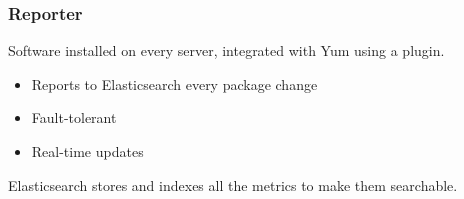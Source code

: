 \documentclass[aspectratio=169]{beamer}
\begin{document}

\begin{frame}
    \frametitle{Reporter}

    Software installed on every server, integrated with Yum using a plugin.

    \begin{itemize}
        \item Reports to Elasticsearch every package change
        \item Fault-tolerant
        \item Real-time updates
    \end{itemize}

    Elasticsearch stores and indexes all the metrics to make them searchable.

    \begin{center}
        \vspace{10px}
    \end{center}
\end{frame}

\end{document}
